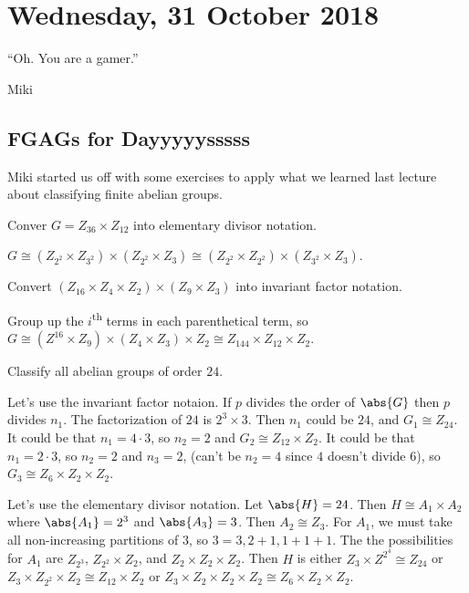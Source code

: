 \section{Wednesday, 31 October 2018}

\epigraph{``Oh. You are a gamer.''}{Miki}

\subsection{FGAGs for Dayyyyysssss}

Miki started us off with some exercises to apply what we learned last lecture about classifying finite abelian groups.

\begin{exercise}
Conver $G = Z_{36} \times Z_{12}$ into elementary divisor notation.

\begin{solution}
$G \cong (Z_{2^2} \times Z_{3^2}) \times (Z_{2^2} \times Z_3) \cong (Z_{2^2} \times Z_{2^2}) \times (Z_{3^2} \times Z_3)$.
\end{solution}
\end{exercise}

\begin{exercise}
Convert $(Z_{16} \times Z_{4} \times Z_2) \times (Z_9 \times Z_3)$ into invariant factor notation.

\begin{solution}
Group up the $i$\textsuperscript{th} terms in each parenthetical term, so $G \cong (Z^{16} \times Z_9) \times (Z_4 \times Z_3) \times Z_2 \cong Z_{144} \times Z_{12} \times Z_{2}$. 
\end{solution}
\end{exercise}

\begin{exercise}
Classify all abelian groups of order $24$.

\begin{solution}
Let's use the invariant factor notaion. If $p$ divides the order of $\abs{G}$ then $p$ divides $n_1$. The factorization of $24$ is $2^3 \times 3$. Then $n_1$ could be $24$, and $G_1 \cong Z_{24}$. It could be that $n_1 = 4 \cdot 3$, so $n_2 = 2$ and $G_{2} \cong Z_{12} \times Z_2$. It could be that $n_1 = 2 \cdot 3$, so $n_2 = 2$ and $n_3 = 2$, (can't be $n_2 = 4$ since $4$ doesn't divide $6$), so $G_3 \cong Z_6 \times Z_2 \times Z_2$.
\end{solution}

\begin{solution}
Let's use the elementary divisor notation. Let $\abs{H} = 24$. Then $H \cong A_1 \times A_2$ where $\abs{A_1} = 2^3$ and $\abs{A_3} = 3$. Then $A_2 \cong Z_3$. For $A_1$, we must take all non-increasing partitions of $3$, so $3 = 3, 2 + 1, 1+1+1$. The the possibilities for $A_1$ are $Z_{2^3}$, $Z_{2^2} \times Z_2$, and $Z_2 \times Z_2 \times Z_2$. Then $H$ is either $Z_3 \times Z^{2^4} \cong Z_24$ or $Z_3 \times Z_{2^2} \times Z_2 \cong Z_{12} \times Z_2$ or $Z_3 \times Z_2 \times Z_2 \times Z_2 \cong Z_6 \times Z_2 \times Z_2$.
\end{solution}
\end{exercise}

